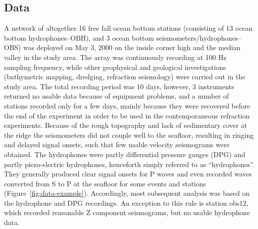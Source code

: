 \documentclass[jgr]{aguplus}
\newlength{\tw}
\begin{document}
\begin{article}
\subsection{Data}

A network of altogether 16 free fall ocean bottom stations (consisting
of 13 ocean bottom hydro\-phones--OBH), and 3 ocean bottom seismometers/hydro\-phones--OBS) was deployed
on May 3, 2000 on the inside corner high and the median valley in the
study area.  The array was continuously recording at 100 Hz sampling frequency, while other
geophysical and geological investigations (bathymetric mapping,
dredging, refraction seismology) were carried out in the study area.
The total recording period was 10 days, however, 3 instruments
returned no usable data because of equipment problems, and a number of
stations recorded only for a few days, mainly because they were
recovered before the end of the experiment in order to be used in the
contemporaneous refraction experiments.  Because of the rough
topography and lack of sedimentary cover at the ridge the seismometers
did not couple well to the seafloor, resulting in ringing and delayed
signal onsets, such that few usable velocity seismograms were
obtained.  The hydrophones were partly differential pressure gauges
(DPG) and partly piezo-electric hydrophones, henceforth simply
referred to as ``hydrophones''.  They generally produced clear signal onsets for
P waves and even recorded waves converted from S to P at the seafloor
for some events and stations
(Figure~\ref{fig:data-example}). Accordingly, most subsequent analysis
was based on the hydrophone and DPG recordings.  An
exception to this rule is station obs12, which recorded reasonable Z
component seismograms, but no usable hydrophone data.


\end{article}
\end{document}
